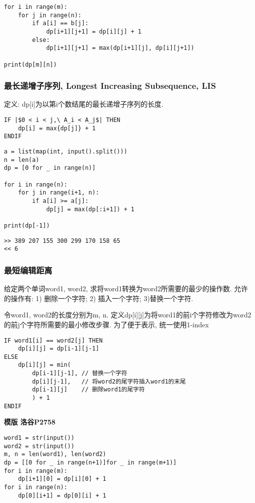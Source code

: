 \documentclass[../main]{subfiles}
\begin{document}
\begin{sloppy}
\begin{lstlisting}[style = Python]
for i in range(m):
    for j in range(n):
        if a[i] == b[j]:
            dp[i+1][j+1] = dp[i][j] + 1
        else:
            dp[i+1][j+1] = max(dp[i+1][j], dp[i][j+1])

print(dp[m][n])
\end{lstlisting}

\subsubsection{最长递增子序列, Longest Increasing Subsequence, LIS}

定义: dp[i]为以第i个数结尾的最长递增子序列的长度.

\begin{lstlisting}[style = Pseudocode, escapeinside=||]
IF |$0 < i < j,\ A_i < A_j$| THEN
    dp[i] = max{dp[j]} + 1
ENDIF 
\end{lstlisting}

\begin{lstlisting}[style = Python]
a = list(map(int, input().split()))
n = len(a)
dp = [0 for _ in range(n)]

for i in range(n):
    for j in range(i+1, n):
        if a[i] >= a[j]:
            dp[j] = max(dp[:i+1]) + 1

print(dp[-1])
\end{lstlisting}

\begin{verbatim}
>> 389 207 155 300 299 170 158 65
<< 6
\end{verbatim}

\newpage
\subsubsection{最短编辑距离}

给定两个单词word1, word2, 求将word1转换为word2所需要的最少的操作数. 允许的操作有: 1) 删除一个字符; 2) 插入一个字符; 3)替换一个字符.

令word1, word2的长度分别为m, n. 定义dp[i][j]为将word1的前i个字符修改为word2的前j个字符所需要的最小修改步骤. 为了便于表示, 统一使用1-index
\begin{lstlisting}[style = Pseudocode]
IF word1[i] == word2[j] THEN
    dp[i][j] = dp[i-1][j-1]
ELSE
    dp[i][j] = min(
        dp[i-1][j-1], // 替换一个字符
        dp[i][j-1],   // 将word2的尾字符插入word1的末尾
        dp[i-1][j]    // 删除word1的尾字符
        ) + 1
ENDIF
\end{lstlisting}

\textbf{模版  洛谷P2758}
\begin{lstlisting}[style = Python]
word1 = str(input())
word2 = str(input())
m, n = len(word1), len(word2)
dp = [[0 for _ in range(n+1)]for _ in range(m+1)]
for i in range(m):
    dp[i+1][0] = dp[i][0] + 1
for i in range(n):
    dp[0][i+1] = dp[0][i] + 1


\end{lstlisting}
\end{sloppy}
\end{document}
